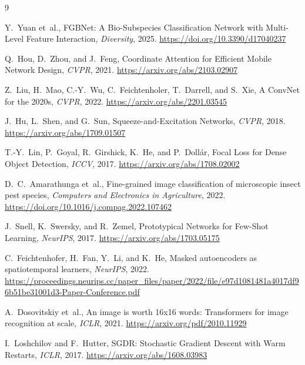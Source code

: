 \documentclass[11pt]{article}
\begin{document}
\newpage



\begin{thebibliography}{9}

Y.~Yuan et~al., FGBNet: A Bio-Subspecies Classification Network with Multi-Level Feature Interaction, \emph{Diversity}, 2025. \url{https://doi.org/10.3390/d17040237}

Q.~Hou, D.~Zhou, and J.~Feng, Coordinate Attention for Efficient Mobile Network Design, \emph{CVPR}, 2021. \url{https://arxiv.org/abs/2103.02907}

Z.~Liu, H.~Mao, C.-Y.~Wu, C.~Feichtenholer, T.~Darrell, and S.~Xie, A ConvNet for the 2020s, \emph{CVPR}, 2022. \url{https://arxiv.org/abs/2201.03545}

J.~Hu, L.~Shen, and G.~Sun, Squeeze-and-Excitation Networks, \emph{CVPR}, 2018. \url{https://arxiv.org/abs/1709.01507}

T.-Y.~Lin, P.~Goyal, R.~Girshick, K.~He, and P.~Doll\'{a}r, Focal Loss for Dense Object Detection, \emph{ICCV}, 2017. \url{https://arxiv.org/abs/1708.02002}

D.~C.~Amarathunga et~al., Fine-grained image classification of microscopic insect pest species, \emph{Computers and Electronics in Agriculture}, 2022. \url{https://doi.org/10.1016/j.compag.2022.107462}

J.~Snell, K.~Swersky, and R.~Zemel, Prototypical Networks for Few-Shot Learning, \emph{NeurIPS}, 2017. \url{https://arxiv.org/abs/1703.05175}

C.~Feichtenhofer, H.~Fan, Y.~Li, and K.~He, Masked autoencoders as spatiotemporal learners, \emph{NeurIPS}, 2022. \url{https://proceedings.neurips.cc/paper_files/paper/2022/file/e97d1081481a4017df96b51be31001d3-Paper-Conference.pdf}

A.~Dosovitskiy et~al., An image is worth 16x16 words: Transformers for image recognition at scale, \emph{ICLR}, 2021. \url{https://arxiv.org/pdf/2010.11929}

I.~Loshchilov and F.~Hutter, SGDR: Stochastic Gradient Descent with Warm Restarts, \emph{ICLR}, 2017. \url{https://arxiv.org/abs/1608.03983}

\end{thebibliography}
\end{document}
